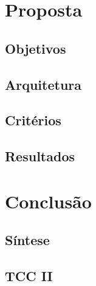 \chapter{Proposta}
\section{Objetivos}
\section{Arquitetura}
\section{Critérios}
\section{Resultados}
\chapter{Conclusão}
\section{Síntese}
\section{TCC II}

